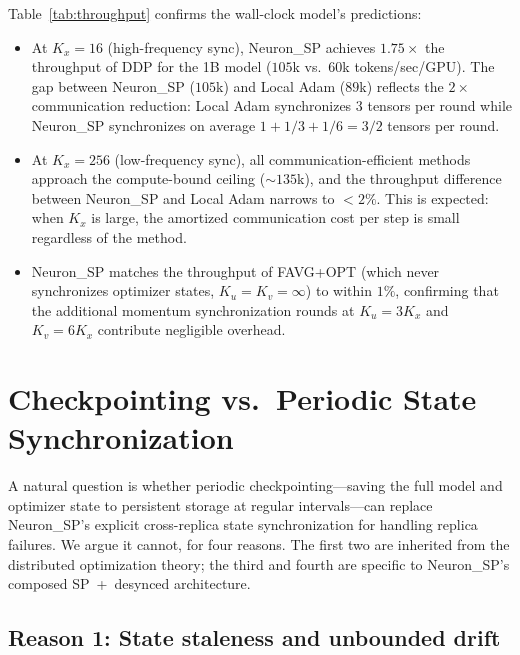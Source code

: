 \documentclass{article}
\begin{document}
Table~\ref{tab:throughput} confirms the wall-clock model's predictions:

\begin{itemize}
\item At $K_x = 16$ (high-frequency sync), Neuron\_SP achieves $1.75\times$
the throughput of DDP for the 1B model ($105$k vs.\ $60$k tokens/sec/GPU).
The gap between Neuron\_SP ($105$k) and Local Adam ($89$k) reflects the
$2\times$ communication reduction: Local Adam synchronizes $3$ tensors per
round while Neuron\_SP synchronizes on average
$1 + 1/3 + 1/6 = 3/2$ tensors per round.

\item At $K_x = 256$ (low-frequency sync), all communication-efficient
methods approach the compute-bound ceiling ($\sim 135$k), and the
throughput difference between Neuron\_SP and Local Adam narrows to $<2\%$.
This is expected: when $K_x$ is large, the amortized communication cost
per step is small regardless of the method.

\item Neuron\_SP matches the throughput of FAVG+OPT (which never
synchronizes optimizer states, $K_u = K_v = \infty$) to within $1\%$,
confirming that the additional momentum synchronization rounds at
$K_u = 3K_x$ and $K_v = 6K_x$ contribute negligible overhead.
\end{itemize}




\section{Checkpointing vs.\ Periodic State Synchronization}
\label{sec:checkpoint}

A natural question is whether periodic checkpointing---saving the full
model and optimizer state to persistent storage at regular intervals---can
replace Neuron\_SP's explicit cross-replica state synchronization for
handling replica failures. We argue it cannot, for four reasons. The first
two are inherited from the distributed optimization theory; the third and
fourth are specific to Neuron\_SP's composed SP~+~desynced architecture.

\subsection{Reason 1: State staleness and unbounded drift}
\label{sec:checkpoint_staleness}
\end{document}
